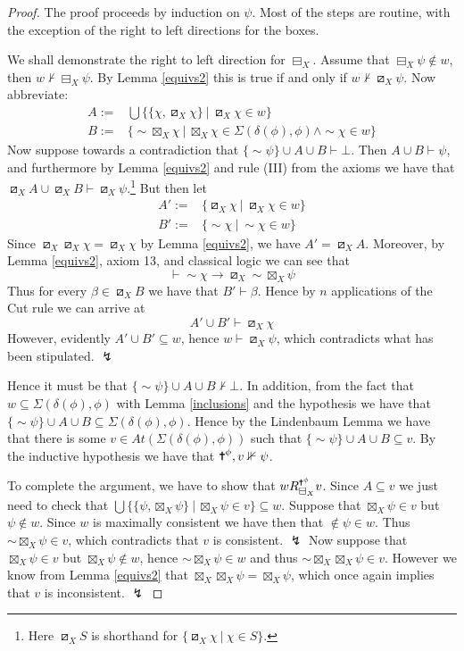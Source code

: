 \documentclass[11pt]{article}
\numberwithin{equation}{subsection}
\renewcommand{\Cross}{\textrm{\ding{61}}}
\newcommand{\BB}{\boxminus}
\newcommand{\pBB}{\boxslash}
\newcommand{\pBBI}{\boxtimes}
\begin{document}
\begin{proof} The proof proceeds by induction on $\psi$.  Most of the steps are routine, with the exception of the right to left directions for the boxes.

We shall demonstrate the right to left direction for $\BB_X$.  Assume that $\BB_X \psi \nin w$, then $w \nvdash \BB_X \psi$.  By Lemma \ref{equivs2} this is true if and only if $w \nvdash \pBB_X \psi$.  Now abbreviate:
\begin{align*}
A := & \bigcup \{ \{\chi,\pBB_X \chi\}\ |\ \pBB_X \chi \in w \}\\
B := & \{ \sim \pBBI_X \chi \ | \ \pBBI_X \chi \in \Sigma(\delta(\phi),\phi) \wedge \sim\chi \in w \}
\end{align*}
Now suppose towards a contradiction that $\{\sim \psi\} \cup A \cup B \vdash \bot$.  Then $A \cup B \vdash \psi$, and furthermore by Lemma \ref{equivs2} and rule (III) from the axioms we have that $\pBB_X A \cup \pBB_X B \vdash \pBB_X \psi$.\footnote{Here $\pBB_X S$ is shorthand for $\{ \pBB_X \chi \ |\ \chi \in S\}$.} But then let 
\begin{align*}
A' := & \{ \pBB_X \chi\ |\ \pBB_X \chi \in w \}\\
B' := & \{ \sim \chi \ | \  \sim\chi \in w \}
\end{align*}
Since $\pBB_X \pBB_X \chi = \pBB_X \chi$ by Lemma \ref{equivs2}, we have $A' = \pBB_X A$.  Moreover, by Lemma \ref{equivs2}, axiom 13, and classical logic we can see that
\[ \vdash \sim \chi \to \pBB_X \sim \pBBI_X \psi \]
Thus for every $\beta \in \pBB_X B$ we have that $B' \vdash \beta$.  Hence by $n$ applications of the Cut rule we can arrive at 
\[ A' \cup B' \vdash \pBB_X \chi \]
However, evidently $A' \cup B' \subseteq w$, hence $w \vdash \pBB_X \psi$, which contradicts what has been stipulated. $\lightning$

Hence it must be that $\{\sim \psi\} \cup A \cup B \nvdash \bot$.  In addition, from the fact that $w \subseteq \Sigma(\delta(\phi),\phi)$ with Lemma  \ref{inclusions} and the hypothesis we have that $\{\sim \psi\} \cup A \cup B \subseteq \Sigma(\delta(\phi),\phi)$.  Hence by the Lindenbaum Lemma we have that there is some $v \in At(\Sigma(\delta(\phi),\phi))$ such that $\{\sim \psi\} \cup A \cup B \subseteq v$.  By the inductive hypothesis we have that $\Cross^\phi, v \nVdash \psi$.

To complete the argument, we have to show that $w R^{\Cross^\phi}_{\BB_X} v$.  Since $A \subseteq v$ we just need to check that $\bigcup\{ \{\psi,\pBBI_X \psi\} \ |\ \pBBI_X \psi \in v\} \subseteq w$.  Suppose that $\pBBI_X \psi \in v$ but $\psi \nin w$.  Since $w$ is maximally consistent we have then that $\nin \psi \in w$.  Thus $\sim \pBBI_X \psi \in v$, which contradicts that $v$ is consistent. $\lightning$  Now suppose that $\pBBI_X \psi \in v$ but $\pBBI_X \psi \nin w$, hence $\sim \pBBI_X \psi \in w$ and thus $\sim \pBBI_X \pBBI_X \psi \in v$.  However we know from Lemma \ref{equivs2} that $\pBBI_X \pBBI_X \psi = \pBBI_X \psi$, which once again implies that $v$ is inconsistent. $\lightning$
\end{proof}
\end{document}

